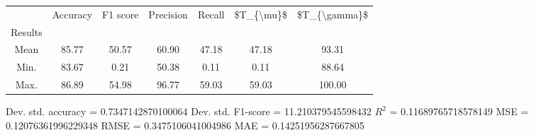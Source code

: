 \begin{tabular}{|c|c|c|c|c|c|c|}
\toprule
{} &  Accuracy &  F1 score &  Precision &  Recall &  \$T\_\{\textbackslash mu\}\$ &  \$T\_\{\textbackslash gamma\}\$ \\
Results &           &           &            &         &            &               \\
\hline
Mean    &     85.77 &     50.57 &      60.90 &   47.18 &      47.18 &         93.31 \\
Min.    &     83.67 &      0.21 &      50.38 &    0.11 &       0.11 &         88.64 \\
Max.    &     86.89 &     54.98 &      96.77 &   59.03 &      59.03 &        100.00 \\
\bottomrule
\end{tabular}

 Dev. std. accuracy = 0.7347142870100064
 Dev. std. F1-score = 11.210379545598432
 $R^2$ = 0.11689765718578149
 MSE = 0.12076361996229348
 RMSE = 0.3475106041004986
 MAE = 0.14251956287667805